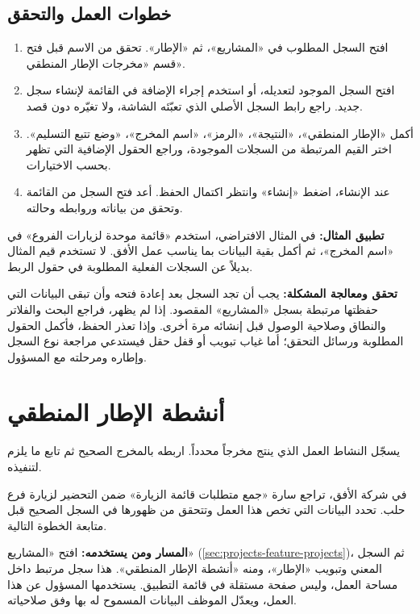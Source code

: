 \subsection{خطوات العمل والتحقق}
\begin{enumerate}
\item افتح السجل المطلوب في «المشاريع»، ثم «الإطار». تحقق من الاسم قبل فتح قسم «مخرجات الإطار المنطقي».
\item افتح السجل الموجود لتعديله، أو استخدم إجراء الإضافة في القائمة لإنشاء سجل جديد. راجع رابط السجل الأصلي الذي تعبّئه الشاشة، ولا تغيّره دون قصد.
\item أكمل «الإطار المنطقي»، «النتيجة»، «الرمز»، «اسم المخرج»، «وضع تتبع التسليم». اختر القيم المرتبطة من السجلات الموجودة، وراجع الحقول الإضافية التي تظهر بحسب الاختيارات.
\item عند الإنشاء، اضغط «إنشاء» وانتظر اكتمال الحفظ. أعد فتح السجل من القائمة وتحقق من بياناته وروابطه وحالته.
\end{enumerate}

\textbf{تطبيق المثال:} في المثال الافتراضي، استخدم «قائمة موحدة لزيارات الفروع» في «اسم المخرج»، ثم أكمل بقية البيانات بما يناسب عمل الأفق. لا تستخدم قيم المثال بديلاً عن السجلات الفعلية المطلوبة في حقول الربط.

\textbf{تحقق ومعالجة المشكلة:} يجب أن تجد السجل بعد إعادة فتحه وأن تبقى البيانات التي حفظتها مرتبطة بسجل «المشاريع» المقصود. إذا لم يظهر، فراجع البحث والفلاتر والنطاق وصلاحية الوصول قبل إنشائه مرة أخرى. وإذا تعذر الحفظ، فأكمل الحقول المطلوبة ورسائل التحقق؛ أما غياب تبويب أو قفل حقل فيستدعي مراجعة نوع السجل وإطاره ومرحلته مع المسؤول.

\clearpage
\section{أنشطة الإطار المنطقي}
\label{sec:projects-feature-logframe-activities}

يسجّل النشاط العمل الذي ينتج مخرجاً محدداً. اربطه بالمخرج الصحيح ثم تابع ما يلزم لتنفيذه.

\begin{rcnote}
في شركة الأفق، تراجع سارة «جمع متطلبات قائمة الزيارة» ضمن التحضير لزيارة فرع حلب. تحدد البيانات التي تخص هذا العمل وتتحقق من ظهورها في السجل الصحيح قبل متابعة الخطوة التالية.
\end{rcnote}

\textbf{المسار ومن يستخدمه:} افتح «المشاريع» (\ref{sec:projects-feature-projects})، ثم السجل المعني وتبويب «الإطار»، ومنه «أنشطة الإطار المنطقي». هذا سجل مرتبط داخل مساحة العمل، وليس صفحة مستقلة في قائمة التطبيق. يستخدمها المسؤول عن هذا العمل، ويعدّل الموظف البيانات المسموح له بها وفق صلاحياته.

